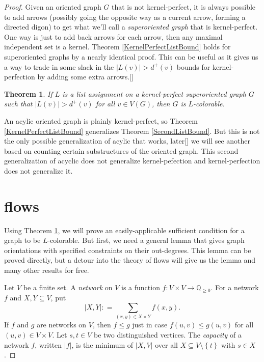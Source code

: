 \documentclass{amsbook}
\newcommand{\aaside}[2]{\marginnote{\scriptsize{#1}}[#2]}
\theoremstyle{plain}
\newtheorem{theorem}{Theorem}
\numberwithin{equation}{chapter}
\newcommand{\set}[1]{\left\{ #1 \right\}}
\newcommand{\card}[1]{\left|#1\right|}
\newcommand{\func}[3]{#1\colon #2 \rightarrow #3}
\newcommand{\DefinedAs}{\mathrel{\mathop:}=}
\newcommand{\Q}{\mathbb{Q}}
\begin{document}
\begin{proof}
Given an oriented graph $G$ that is not kernel-perfect, it is always possible to add arrows (possibly going the opposite way as a current arrow, forming a directed digon) 
to get what we'll call a \emph{superoriented graph} that is kernel-perfect.  One way is just to add back arrows for each arrow, then any maximal independent set is a kernel.
Theorem \ref{KernelPerfectListBound} holds for superoriented graphs by a nearly identical proof.  
This can be useful as it gives us a way to trade in some slack in the $\card{L(v)} > d^+(v)$ bounds for kernel-perfection by adding some extra arrows.\aaside{example, picture}{}

\begin{theorem}\label{KernelPerfectSuperListBound}
If $L$ is a list assignment on a kernel-perfect superoriented graph $G$ such that $\card{L(v)} > d^+(v)$ for all $v \in V(G)$, then $G$ is $L$-colorable.
\end{theorem}

An acylic oriented graph is plainly kernel-perfect, so Theorem \ref{KernelPerfectListBound} generalizes Theorem \ref{SecondListBound}.  
But this is not the only possible generalization of acylic that works, later\aaside{when?}{} we will see another based on counting certain substructures of the oriented graph. 
This second generalization of acyclic does not generalize kernel-pefection and kernel-perfection does not generalize it.

\section*{flows}
Using Theorem \ref{KernelPerfectSuperListBound}, we will prove an easily-applicable sufficient condition for a graph to be $L$-colorable.  
But first, we need a general lemma that gives graph orientations with specified constraints on their out-degrees.  This lemma can be proved directly, 
but a detour into the theory of flows will give us the lemma and many other results for free.

Let $V$ be a finite set.  A \emph{network} on $V$ is a function $\func{f}{V\times V}{\Q_{\ge 0}}$.  For a network $f$ and $X,Y \subseteq V$, put
\[\card{X,Y} \DefinedAs \sum_{(x,y) \in X\times Y} f(x,y).\]
If $f$ and $g$ are networks on $V$, then $f \le g$ just in case $f(u,v) \le g(u,v)$ for all $(u,v)\in V\times V$.
Let $s,t \in V$ be two distinguished vertices.  The \emph{capacity} of a network $f$, written $\card{f}$, is the minimum of $\card{X, V}$ over all $X \subseteq V\setminus\set{t}$ with $s \in X$.


\end{proof}
\end{document}
